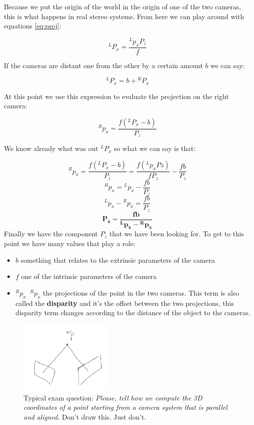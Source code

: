 Because we put the origin of the world in the origin of one of the two cameras, this is what happens in real stereo systems. From here we can play around with equations \ref{eq:proj}:

\[
    {}^LP_x = \frac{{}^Lp_xP_z}{f}    
\]

If the cameras are distant one from the other by a certain amount \(b\) we can say:

\[
    {}^LP_x = b+{}^RP_x
\]

At this point we use this expression to evaluate the projection on the right camera:

\[
    {}^Rp_x = \frac{f({}^LP_x-b)}{P_z}    
\]

We know already what was out \({}^LP_x\) so what we can say is that: 

\[
    {}^Rp_x = \frac{f({}^LP_x-b)}{P_z}    
    =
    \frac{f({}^Lp_xPz)}{fP_z}-\frac{fb}{P_z}
\]
\[
    {}^Rp_x ={}^Lp_x-\frac{fb}{P_z}
\]
\[
    {}^Lp_x- {}^Rp_x = \frac{fb}{P_z}
\]
\[
    \bm{{P_z} = \frac{fb}{{}^Lp_x- {}^Rp_x}}
\]
Finally we have the component \(P_z\) that we have been looking for. To get to this point we have many values that play a role:
\begin{itemize}
    \item \(b\)  something that relates to the extrinsic parameters of the camera
    \item \(f\) one of the intrinsic parameters of the camera
    \item \({}^Rp_x \;\; {}^Rp_x\) the projections of the point in the two cameras. This term is also called the \textbf{disparity} and it's the offset between the two projections, this disparity term changes according to the distance of the object to the cameras.
\end{itemize}

\begin{figure}[H]
    \centering
    \includegraphics[width=0.4\textwidth]{Figures/mistake.png}
    \caption{Typical exam question: \textit{Please, tell how we compute the 3D coordinates of a point starting from a camera system that is parallel and aligned.} Don't draw this. Just don't.}
    \label{fig:mistake}
\end{figure}

